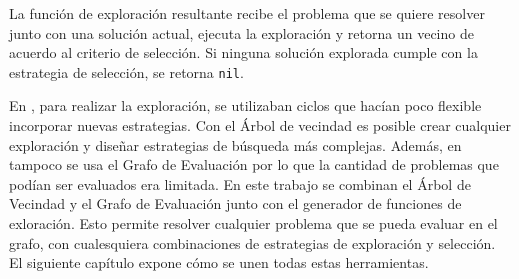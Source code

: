 La función de exploración resultante recibe el problema que se quiere resolver junto con una solución actual, ejecuta la exploración y retorna un vecino de acuerdo al criterio de selección. Si ninguna solución explorada cumple con la estrategia de selección, se retorna \texttt{nil}. 

En \cite{Heidy}, para realizar la exploración, se utilizaban ciclos que hacían poco flexible incorporar nuevas estrategias. Con el Árbol de vecindad es posible crear cualquier exploración y diseñar estrategias de búsqueda más complejas. Además, en \cite{Heidy} tampoco se usa el Grafo de Evaluación por lo que la cantidad de problemas que podían ser evaluados era limitada. En este trabajo se combinan el Árbol de Vecindad y el Grafo de Evaluación junto con el generador de funciones de exloración. Esto permite resolver cualquier problema que se pueda evaluar en el grafo, con cualesquiera combinaciones de estrategias de exploración y selección. El siguiente capítulo expone cómo se unen todas estas herramientas.





























